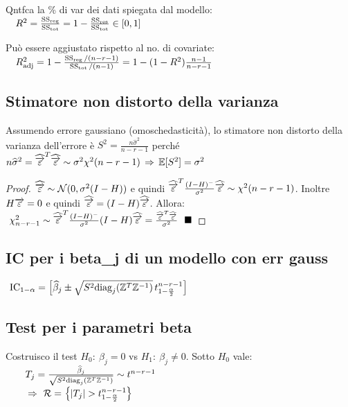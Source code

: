 Qntfca la \% di var dei dati spiegata dal modello: \\
$\text{}\quad R^2=\frac{ \operatorname{SS}_{\text{reg}}}{ \operatorname{SS}_{\text{tot}}}=1-\frac{ \operatorname{SS}_{\text{res}}}{ \operatorname{SS}_{\text{tot}}}\in[0,1]$

\smallskip

Può essere aggiustato rispetto al no. di covariate: \\
$\text{}\quad R^2_{\text{adj}}=1-\frac{ \operatorname{SS}_{\text{reg}}/(n-r-1)}{ \operatorname{SS}_{\text{tot}}/(n-1)}=1-(1-R^2)\frac{n-1}{n-r-1}$

\subsection{Stimatore non distorto della varianza}

Assumendo errore gaussiano (omoschedasticità), lo stimatore non distorto della varianza dell'errore è $S^2=\frac{n\hat{\sigma}^2}{n-r-1}$ perché $n\widehat{\sigma}^2=\widehat{\overrightarrow{\varepsilon}}^T\widehat{\overrightarrow{\varepsilon}}\sim\sigma^2\chi^2(n-r-1)\,\Rightarrow\,\mathbb{E}[S^2]=\sigma^2$

\begin{proof}
$\widehat{\overrightarrow{\varepsilon}}\sim\mathcal{N}(0,\sigma^2(I-H))$ e quindi $\widehat{\overrightarrow{\varepsilon}}^T\frac{(I-H)^{-}}{\sigma^2}\widehat{\overrightarrow{\varepsilon}}\sim\chi^2(n-r-1)$. Inoltre $H\overrightarrow{\varepsilon}=0$ e quindi $\widehat{\overrightarrow{\varepsilon}}=(I-H)\widehat{\overrightarrow{\varepsilon}}$. Allora: \\
$\text{}\ \chi^2_{n-r-1}\sim\hat{\erv}^T\frac{(I-H)^{-}}{\sigma^2}(I-H)\hat{\erv}=\frac{\hat{\erv}^T\hat{\erv}}{\sigma^2}\ \ \blacksquare$
\end{proof}

\subsection{IC per i beta\_j di un modello con err gauss}

$\text{ IC}_{1-\alpha}=\left[\widehat{\beta}_j\pm\sqrt{S^2\text{diag}_j(\mathbb{Z}^T\mathbb{Z}^{-1})}\,t_{1-\frac{\alpha}{2}}^{n-r-1}\right]$

\subsection{Test per i parametri beta}

Costruisco il test $H_0:\ \beta_j=0$ vs $H_1:\ \beta_j\neq 0$. Sotto $H_0$ vale: \\
$\text{}\qquad T_j=\frac{\widehat{\beta}_j}{\sqrt{S^2\text{diag}_j(\mathbb{Z}^T\mathbb{Z}^{-1})}}\sim t^{n-r-1}$ \\
$\text{}\qquad\Rightarrow\ \Rc=\left\{\left|T_j\right|>t_{1-\frac{\alpha}{2}}^{n-r-1}\right\}$

